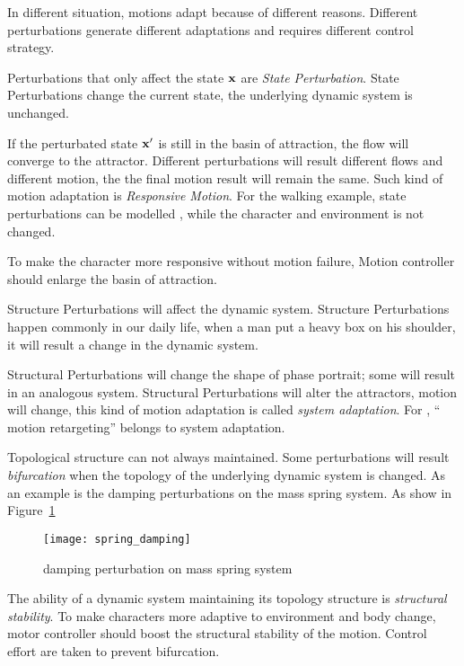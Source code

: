 In different situation, motions adapt because of different reasons.
Different perturbations generate different adaptations and requires different control strategy.

\begin{itemize}

Perturbations that only affect the state $\mathbf{x}$ are \emph{State Perturbation}.
State Perturbations change the current state, the underlying dynamic system is unchanged.


If the perturbated state $\mathbf{x}'$ is still in the basin of attraction, the flow will converge to the attractor. 
Different perturbations will result different flows and different motion, the the final motion result will remain the same.
Such kind of motion adaptation is \emph{Responsive Motion}.
For the walking example, state perturbations can be modelled , while the character and environment is not changed.

To make the character more responsive without motion failure,
Motion controller should enlarge the basin of attraction.






Structure Perturbations will affect the dynamic system.
Structure Perturbations happen commonly in our daily life, when a man put a heavy box on his shoulder, it will result a change in the dynamic system.



Structural Perturbations will change the shape of phase portrait; some will result in an analogous system.
Structural Perturbations will alter the  attractors, motion will change, this kind of motion adaptation is called \emph{system adaptation}.
For \cms, `` motion retargeting'' belongs to system adaptation.

Topological structure can not always maintained.
Some perturbations will result \emph{bifurcation} when the topology of the underlying dynamic system is changed.
As an  example is the damping perturbations on the mass spring system.
As show in Figure~\ref{fig:dampmass}

\begin{figure}
\begin{center}
\texttt{[image: spring\_damping]}
\end{center}
\caption{damping perturbation on mass spring system}
\label{fig:dampmass}
\end{figure}

The ability of a dynamic system maintaining its topology structure is \emph{structural stability}.
To make characters more adaptive to environment and body change, motor controller should boost the structural stability of the motion.
Control effort are taken to prevent bifurcation.
\end{itemize}


